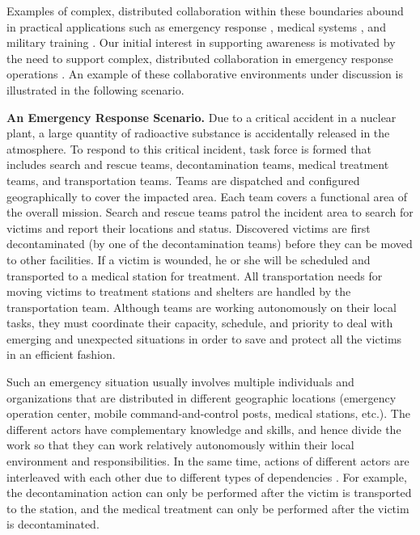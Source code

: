 Examples of complex, distributed collaboration within these boundaries abound in practical applications such as emergency response \cite{Turoff2004}, medical systems \cite{Blandford2004}, and military training \cite{mathieu2000influence}. Our initial interest in supporting awareness is motivated by the need to support complex, distributed collaboration in emergency response operations \cite{Cai2005b,Cai2005a}. An example of these collaborative environments under discussion is illustrated in the following scenario.

\begin{scenario}
\textbf{An Emergency Response Scenario.} 
Due to a critical accident in a nuclear plant, a large quantity of radioactive substance is accidentally released in the atmosphere. To respond to this critical incident, task force is formed that includes search and rescue teams, decontamination teams, medical treatment teams, and transportation teams. Teams are dispatched and configured geographically to cover the impacted area. Each team covers a functional area of the overall mission.  Search and rescue teams patrol the incident area to search for victims and report their locations and status. Discovered victims are first decontaminated (by one of the decontamination teams) before they can be moved to other facilities.  If a victim is wounded, he or she will be scheduled and transported to a medical station for treatment. All transportation needs for moving victims to treatment stations and shelters are handled by the transportation team. Although teams are working autonomously on their local tasks, they must coordinate their capacity, schedule, and priority to deal with emerging and unexpected situations in order to save and protect all the victims in an efficient fashion.
\end{scenario}

Such an emergency situation usually involves multiple individuals and organizations that are distributed in different geographic locations (emergency operation center, mobile command-and-control posts, medical stations, etc.). The different actors have complementary knowledge and skills, and hence divide the work so that they can work relatively autonomously within their local environment and responsibilities. In the same time, actions of different actors are interleaved with each other due to different types of dependencies \cite{shen2004managing}. For example, the decontamination action can only be performed after the victim is transported to the station, and the medical treatment can only be performed after the victim is decontaminated.

